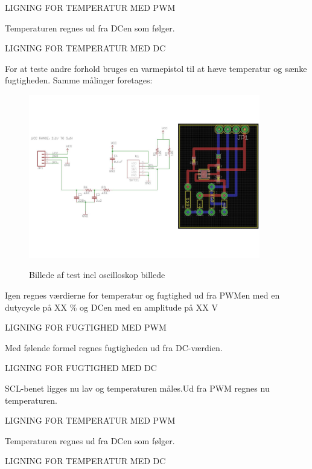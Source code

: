 LIGNING FOR TEMPERATUR MED PWM

Temperaturen regnes ud fra DCen som følger. 

LIGNING FOR TEMPERATUR MED DC


For at teste andre forhold bruges en varmepistol til at hæve temperatur og sænke fugtigheden. 
Samme målinger foretages:

\begin{figure}[h]
\centering
{\includegraphics[width=0.90\textwidth]{filer/modultest/Billeder/test_varmt}}
\caption{Billede af test incl oscilloskop billede}
\label{lab:test_varmt}
\end{figure}

Igen regnes værdierne for temperatur og fugtighed ud fra PWMen med en dutycycle på XX \% og DCen med en amplitude på XX V


LIGNING FOR FUGTIGHED MED PWM

Med følende formel regnes fugtigheden ud fra DC-værdien.

LIGNING FOR FUGTIGHED MED DC

SCL-benet ligges nu lav og temperaturen måles.Ud fra PWM regnes nu temperaturen.

LIGNING FOR TEMPERATUR MED PWM

Temperaturen regnes ud fra DCen som følger. 

LIGNING FOR TEMPERATUR MED DC

